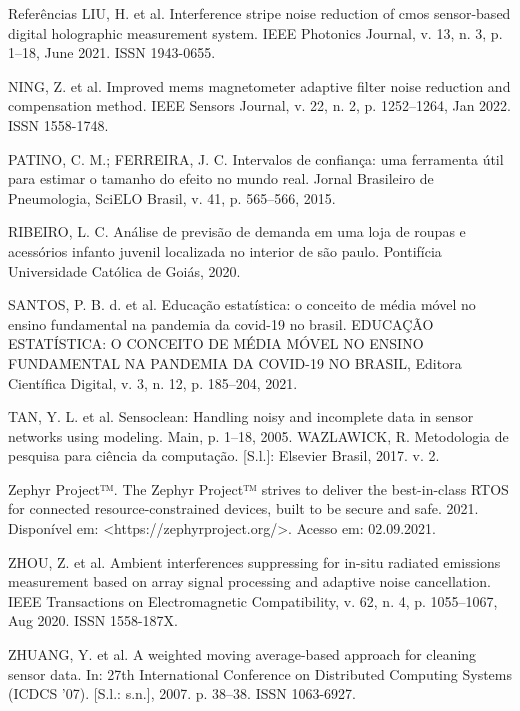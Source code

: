 \documentclass[]{beamer}
\begin{document}
\begin{frame}[allowframebreaks]{Referências}
	LIU, H. et al. Interference stripe noise reduction of cmos sensor-based digital holographic
	measurement system. IEEE Photonics Journal, v. 13, n. 3, p. 1–18, June 2021. ISSN
	1943-0655.


	NING, Z. et al. Improved mems magnetometer adaptive filter noise reduction and
	compensation method. IEEE Sensors Journal, v. 22, n. 2, p. 1252–1264, Jan 2022. ISSN
	1558-1748.


	PATINO, C. M.; FERREIRA, J. C. Intervalos de confiança: uma ferramenta útil para
	estimar o tamanho do efeito no mundo real. Jornal Brasileiro de Pneumologia, SciELO
	Brasil, v. 41, p. 565–566, 2015.


	RIBEIRO, L. C. Análise de previsão de demanda em uma loja de roupas e acessórios
	infanto juvenil localizada no interior de são paulo. Pontifícia Universidade Católica de
	Goiás, 2020.


	SANTOS, P. B. d. et al. Educação estatística: o conceito de média móvel no ensino
	fundamental na pandemia da covid-19 no brasil. EDUCAÇÃO ESTATÍSTICA: O
	CONCEITO DE MÉDIA MÓVEL NO ENSINO FUNDAMENTAL NA PANDEMIA DA
	COVID-19 NO BRASIL, Editora Científica Digital, v. 3, n. 12, p. 185–204, 2021.


	TAN, Y. L. et al. Sensoclean: Handling noisy and incomplete data in sensor networks
	using modeling. Main, p. 1–18, 2005.
	WAZLAWICK, R. Metodologia de pesquisa para ciência da computação. [S.l.]: Elsevier
	Brasil, 2017. v. 2.


	Zephyr Project™. The Zephyr Project™ strives to deliver the best-in-class RTOS for
	connected resource-constrained devices, built to be secure and safe. 2021. Disponível em:
	<https://zephyrproject.org/>. Acesso em: 02.09.2021.


	ZHOU, Z. et al. Ambient interferences suppressing for in-situ radiated emissions
	measurement based on array signal processing and adaptive noise cancellation. IEEE
	Transactions on Electromagnetic Compatibility, v. 62, n. 4, p. 1055–1067, Aug 2020. ISSN
	1558-187X.


	ZHUANG, Y. et al. A weighted moving average-based approach for cleaning sensor data.
	In: 27th International Conference on Distributed Computing Systems (ICDCS ’07). [S.l.:
	s.n.], 2007. p. 38–38. ISSN 1063-6927.

\end{frame}

		
\end{document}
